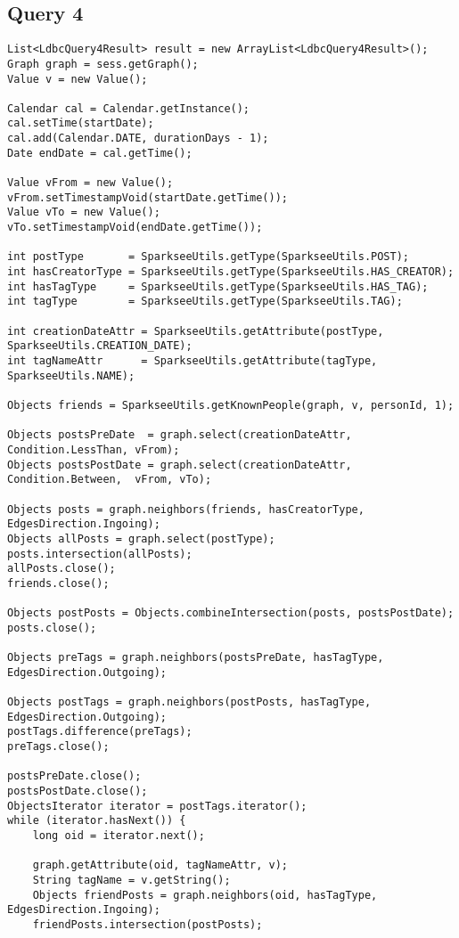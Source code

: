 \subsection{Query 4}

{\footnotesize
\begin{verbatim}
List<LdbcQuery4Result> result = new ArrayList<LdbcQuery4Result>();
Graph graph = sess.getGraph();
Value v = new Value();

Calendar cal = Calendar.getInstance();
cal.setTime(startDate);
cal.add(Calendar.DATE, durationDays - 1);
Date endDate = cal.getTime();

Value vFrom = new Value();
vFrom.setTimestampVoid(startDate.getTime());
Value vTo = new Value();
vTo.setTimestampVoid(endDate.getTime());

int postType       = SparkseeUtils.getType(SparkseeUtils.POST);
int hasCreatorType = SparkseeUtils.getType(SparkseeUtils.HAS_CREATOR);
int hasTagType     = SparkseeUtils.getType(SparkseeUtils.HAS_TAG);
int tagType        = SparkseeUtils.getType(SparkseeUtils.TAG);

int creationDateAttr = SparkseeUtils.getAttribute(postType,   SparkseeUtils.CREATION_DATE);
int tagNameAttr      = SparkseeUtils.getAttribute(tagType,    SparkseeUtils.NAME);

Objects friends = SparkseeUtils.getKnownPeople(graph, v, personId, 1);

Objects postsPreDate  = graph.select(creationDateAttr, Condition.LessThan, vFrom);
Objects postsPostDate = graph.select(creationDateAttr, Condition.Between,  vFrom, vTo);

Objects posts = graph.neighbors(friends, hasCreatorType, EdgesDirection.Ingoing);
Objects allPosts = graph.select(postType);
posts.intersection(allPosts);
allPosts.close();
friends.close();

Objects postPosts = Objects.combineIntersection(posts, postsPostDate);
posts.close();

Objects preTags = graph.neighbors(postsPreDate, hasTagType, EdgesDirection.Outgoing);

Objects postTags = graph.neighbors(postPosts, hasTagType, EdgesDirection.Outgoing);
postTags.difference(preTags);
preTags.close();

postsPreDate.close();
postsPostDate.close();
ObjectsIterator iterator = postTags.iterator();
while (iterator.hasNext()) {
    long oid = iterator.next();

    graph.getAttribute(oid, tagNameAttr, v);
    String tagName = v.getString();
    Objects friendPosts = graph.neighbors(oid, hasTagType, EdgesDirection.Ingoing);
    friendPosts.intersection(postPosts);


\end{verbatim}}
